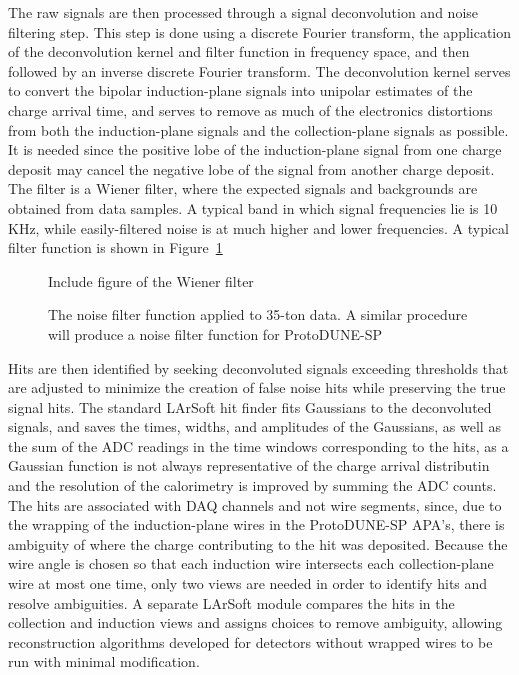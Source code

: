 The raw signals are then processed through a signal deconvolution and
noise filtering step.  This step is done using a discrete Fourier
transform, the application of the deconvolution kernel and filter
function in frequency space, and then followed by an inverse discrete
Fourier transform.  The deconvolution kernel serves to convert the
bipolar induction-plane signals into unipolar estimates of the charge
arrival time, and serves to remove as much of the electronics
distortions from both the induction-plane signals and the
collection-plane signals as possible.  It is needed since the positive
lobe of the induction-plane signal from one charge deposit may cancel
the negative lobe of the signal from another charge deposit.  The
filter is a Wiener filter, where the expected signals and backgrounds
are obtained from data samples.  A typical band in which signal
frequencies lie is 10 KHz, while easily-filtered noise is at much
higher and lower frequencies.  A typical filter function is shown in
Figure~\ref{fig:wienerfilter}

\begin{figure}[htb]
\centering
Include figure of the Wiener filter
\caption{The noise filter function applied to 35-ton data.  A similar
  procedure will produce a noise filter function for ProtoDUNE-SP}
\label{fig:wienerfilter}
\end{figure}

Hits are then identified by seeking deconvoluted signals exceeding
thresholds that are adjusted to minimize the creation of false noise
hits while preserving the true signal hits.  The standard LArSoft hit
finder fits Gaussians to the deconvoluted signals, and saves the
times, widths, and amplitudes of the Gaussians, as well as the sum of
the ADC readings in the time windows corresponding to the hits, as a
Gaussian function is not always representative of the charge arrival
distributin and the resolution of the calorimetry is improved by
summing the ADC counts.  The hits are associated with DAQ channels and
not wire segments, since, due to the wrapping of the induction-plane
wires in the ProtoDUNE-SP APA's, there is ambiguity of where the
charge contributing to the hit was deposited.  Because the wire angle
is chosen so that each induction wire intersects each collection-plane
wire at most one time, only two views are needed in order to identify
hits and resolve ambiguities.  A separate LArSoft module compares the
hits in the collection and induction views and assigns choices to
remove ambiguity, allowing reconstruction algorithms developed for
detectors without wrapped wires to be run with minimal modification.

